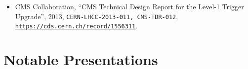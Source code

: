 \documentclass[10pt]{article} %
\begin{document}
\begin{itemize}
\item CMS Collaboration, 
  ``CMS Technical Design Report for the Level-1 Trigger Upgrade'',
  2013, 
  \texttt{CERN-LHCC-2013-011, CMS-TDR-012},
  \texttt{\href{https://cds.cern.ch/record/1556311}{https://cds.cern.ch/record/1556311}}.

\end{itemize}



\section{Notable Presentations}
\end{document}
